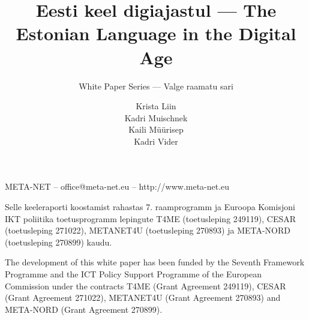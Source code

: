 \documentclass[]{../metanetpaper}
\title{Eesti keel digiajastul --- The Estonian Language in the Digital Age}
\subtitle{White Paper Series --- Valge raamatu sari}
\author{
  Krista Liin\\
  Kadri Muischnek\\
  Kaili Müürisep\\
  Kadri Vider
}
\begin{document}
\renewcommand*{\figureformat}{\sffamily\thefigure\autodot}

\maketitle

\null
\pagestyle{empty} 

\centerline{META-NET -- office@meta-net.eu -- http://www.meta-net.eu}

\vfill

\begin{small}
  Selle keeleraporti koostamist rahastas 7. raamprogramm ja Euroopa
  Komisjoni IKT poliitika toetusprogramm lepingute  
  T4ME (toetusleping  249119), CESAR (toetusleping 271022), METANET4U
  (toetusleping 270893) ja META-NORD
  (toetusleping 270899) kaudu.
\end{small}

\bigskip
\begin{small}
  The development of this white paper has been funded by the Seventh
  Framework Programme and the ICT Policy Support Programme of the
  European Commission under the contracts T4ME (Grant Agreement 249119),
  CESAR (Grant Agreement 271022), METANET4U (Grant Agreement 270893)
  and META-NORD (Grant Agreement 270899).
\end{small}

\clearpage

\setcounter{page}{5}
\pagestyle{scrheadings}

\cleardoublepage


\end{document}
